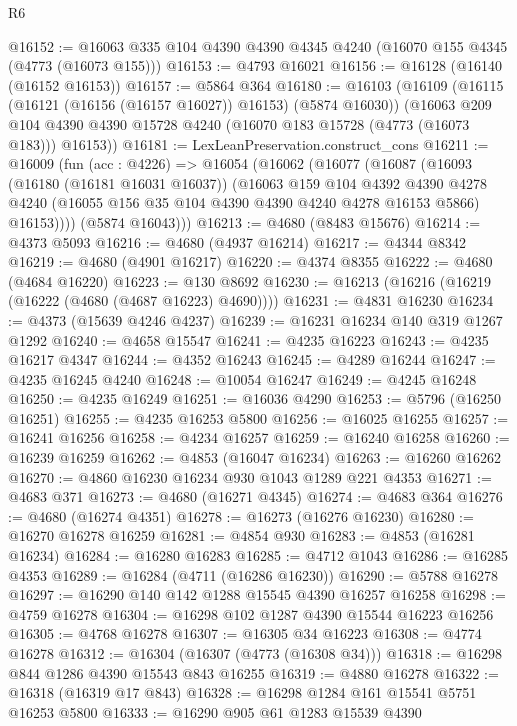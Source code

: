 \begin{lexlean}{R6}
\begin{coremodule}
@16152 := @16063 @335 @104 @4390 @4390 @4345 @4240 (@16070 @155 @4345 (@4773 (@16073 @155)))
@16153 := @4793 @16021
@16156 := @16128 (@16140 (@16152 @16153))
@16157 := @5864 @364
@16180 := @16103
    (@16109
      (@16115 (@16121 (@16156 (@16157 @16027)) @16153) (@5874 @16030))
      (@16063 @209 @104 @4390 @4390 @15728 @4240 (@16070 @183 @15728 (@4773 (@16073 @183))) @16153))
@16181 := LexLeanPreservation.construct_cons
@16211 := @16009
    (fun (acc : @4226) =>
    @16054
      (@16062
        (@16077
          (@16087
            (@16093
              (@16180 (@16181 @16031 @16037))
              (@16063
                @159
                @104
                @4392
                @4390
                @4278
                @4240
                (@16055 @156 @35 @104 @4390 @4390 @4240 @4278 @16153 @5866)
                @16153))))
        (@5874 @16043)))
@16213 := @4680 (@8483 @15676)
@16214 := @4373 @5093
@16216 := @4680 (@4937 @16214)
@16217 := @4344 @8342
@16219 := @4680 (@4901 @16217)
@16220 := @4374 @8355
@16222 := @4680 (@4684 @16220)
@16223 := @130 @8692
@16230 := @16213 (@16216 (@16219 (@16222 (@4680 (@4687 @16223) @4690))))
@16231 := @4831 @16230
@16234 := @4373 (@15639 @4246 @4237)
@16239 := @16231 @16234 @140 @319 @1267 @1292
@16240 := @4658 @15547
@16241 := @4235 @16223
@16243 := @4235 @16217 @4347
@16244 := @4352 @16243
@16245 := @4289 @16244
@16247 := @4235 @16245 @4240
@16248 := @10054 @16247
@16249 := @4245 @16248
@16250 := @4235 @16249
@16251 := @16036 @4290
@16253 := @5796 (@16250 @16251)
@16255 := @4235 @16253 @5800
@16256 := @16025 @16255
@16257 := @16241 @16256
@16258 := @4234 @16257
@16259 := @16240 @16258
@16260 := @16239 @16259
@16262 := @4853 (@16047 @16234)
@16263 := @16260 @16262
@16270 := @4860 @16230 @16234 @930 @1043 @1289 @221 @4353
@16271 := @4683 @371
@16273 := @4680 (@16271 @4345)
@16274 := @4683 @364
@16276 := @4680 (@16274 @4351)
@16278 := @16273 (@16276 @16230)
@16280 := @16270 @16278 @16259
@16281 := @4854 @930
@16283 := @4853 (@16281 @16234)
@16284 := @16280 @16283
@16285 := @4712 @1043
@16286 := @16285 @4353
@16289 := @16284 (@4711 (@16286 @16230))
@16290 := @5788 @16278
@16297 := @16290 @140 @142 @1288 @15545 @4390 @16257 @16258
@16298 := @4759 @16278
@16304 := @16298 @102 @1287 @4390 @15544 @16223 @16256
@16305 := @4768 @16278
@16307 := @16305 @34 @16223
@16308 := @4774 @16278
@16312 := @16304 (@16307 (@4773 (@16308 @34)))
@16318 := @16298 @844 @1286 @4390 @15543 @843 @16255
@16319 := @4880 @16278
@16322 := @16318 (@16319 @17 @843)
@16328 := @16298 @1284 @161 @15541 @5751 @16253 @5800
@16333 := @16290 @905 @61 @1283 @15539 @4390

\end{coremodule}
\end{lexlean}
